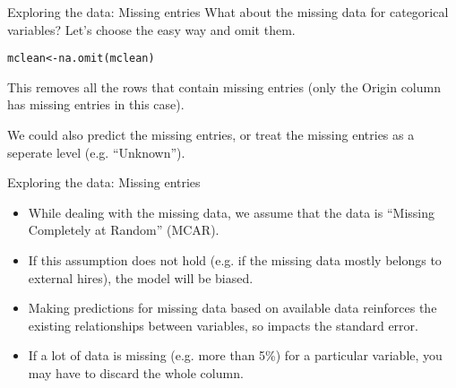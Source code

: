 \documentclass{beamer}\usepackage[]{graphicx}\usepackage[]{color}
\makeatletter
\newcommand{\hlopt}[1]{\textcolor[rgb]{1,0.894,0.769}{#1}}%
\newcommand{\hlstd}[1]{\textcolor[rgb]{1,0.894,0.769}{#1}}%
\newcommand{\hlkwb}[1]{\textcolor[rgb]{0.804,0.776,0.451}{#1}}%
\newcommand{\hlkwc}[1]{\textcolor[rgb]{0.78,0.941,0.545}{#1}}%
\newcommand{\hlkwd}[1]{\textcolor[rgb]{1,0.78,0.769}{#1}}%
\newenvironment{kframe}{%
 \def\at@end@of@kframe{}%
 \ifinner\ifhmode%
  \def\at@end@of@kframe{\end{minipage}}%
  \begin{minipage}{\columnwidth}%
 \fi\fi%
 \def\FrameCommand##1{\hskip\@totalleftmargin \hskip-\fboxsep
 \colorbox{shadecolor}{##1}\hskip-\fboxsep
     \hskip-\linewidth \hskip-\@totalleftmargin \hskip\columnwidth}%
 \MakeFramed {\advance\hsize-\width
   \@totalleftmargin\z@ \linewidth\hsize
   \@setminipage}}%
 {\par\unskip\endMakeFramed%
 \at@end@of@kframe}
\newenvironment{knitrout}{}{} %
\makeatother
\begin{document}
\begin{darkframes}

    \begin{frame}[fragile]{Exploring the data: Missing entries}
      What about the missing data for categorical variables? \pause
      Let's choose the easy way and omit them.

\begin{knitrout}
\color{fgcolor}\begin{kframe}
\begin{alltt}
\hlstd{mclean} \hlkwb{<-} \hlkwd{na.omit}\hlstd{(mclean)}
\end{alltt}
\end{kframe}
\end{knitrout}
      \pause
      This removes all the rows that contain missing entries (only the Origin column has missing entries in this case). \pause \bigskip

      We could also predict the missing entries, or treat the missing entries as a seperate level (e.g. ``Unknown'').
    \end{frame}

    \begin{frame}[fragile]{Exploring the data: Missing entries}
      \begin{itemize}[<+->]
        \item While dealing with the missing data, we assume that the data is ``Missing Completely at Random'' (MCAR).
        \item If this assumption does not hold (e.g. if the missing data mostly belongs to external hires), the model will  be biased.
        \item Making predictions for missing data based on available data reinforces the existing relationships between variables, so impacts the standard error.
        \item If a lot of data is missing (e.g. more than 5\%) for a particular variable, you may have to discard the whole column.
      \end{itemize}
    \end{frame}
  \end{darkframes}
\end{document}
